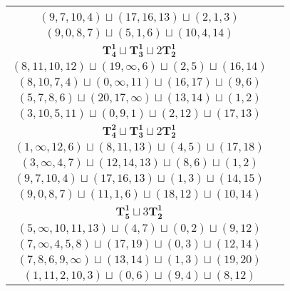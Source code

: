 \documentclass{article}
\begin{document}
\begin{longtable}{|c|c|}
\begin{tabular}{c}
        $(0,\infty,3,4)\sqcup(12,14,13)\sqcup(6,8,7)$ \\ 
        $(9,7,10,4)\sqcup(17,16,13)\sqcup(2,1,3)$ \\ 
        $(9,0,8,7)\sqcup(5,1,6)\sqcup(10,4,14)$
        \end{tabular} \\ 
        \hline
        $\mathbf{T_{4}^{1}} \sqcup \mathbf{T_{3}^{1}} \sqcup 2\mathbf{T_{2}^{1}}$ & \begin{tabular}{c}
        $(11,13,12,15)\sqcup(9,\infty,1)\sqcup(4,5)\sqcup(16,18)$ \\ 
        $(8,11,10,12)\sqcup(19,\infty,6)\sqcup(2,5)\sqcup(16,14)$ \\ 
        $(8,10,7,4)\sqcup(0,\infty,11)\sqcup(16,17)\sqcup(9,6)$ \\ 
        $(5,7,8,6)\sqcup(20,17,\infty)\sqcup(13,14)\sqcup(1,2)$ \\ 
        $(3,10,5,11)\sqcup(0,9,1)\sqcup(2,12)\sqcup(17,13)$
        \end{tabular} \\ 
        \hline
        $\mathbf{T_{4}^{2}} \sqcup \mathbf{T_{3}^{1}} \sqcup 2\mathbf{T_{2}^{1}}$ & \begin{tabular}{c}
        $(18,16,19,\infty)\sqcup(13,12,15)\sqcup(3,5)\sqcup(17,20)$ \\ 
        $(1,\infty,12,6)\sqcup(8,11,13)\sqcup(4,5)\sqcup(17,18)$ \\ 
        $(3,\infty,4,7)\sqcup(12,14,13)\sqcup(8,6)\sqcup(1,2)$ \\ 
        $(9,7,10,4)\sqcup(17,16,13)\sqcup(1,3)\sqcup(14,15)$ \\ 
        $(9,0,8,7)\sqcup(11,1,6)\sqcup(18,12)\sqcup(10,14)$
        \end{tabular} \\ 
        \hline
        $\mathbf{T_{5}^{1}} \sqcup 3\mathbf{T_{2}^{1}}$ & \begin{tabular}{c}
        $(4,1,\infty,13,10)\sqcup(2,3)\sqcup(16,15)\sqcup(9,11)$ \\ 
        $(5,\infty,10,11,13)\sqcup(4,7)\sqcup(0,2)\sqcup(9,12)$ \\ 
        $(7,\infty,4,5,8)\sqcup(17,19)\sqcup(0,3)\sqcup(12,14)$ \\ 
        $(7,8,6,9,\infty)\sqcup(13,14)\sqcup(1,3)\sqcup(19,20)$ \\ 
        $(1,11,2,10,3)\sqcup(0,6)\sqcup(9,4)\sqcup(8,12)$
        \end{tabular} \\ 
        \hline

\end{longtable}
\end{document}
